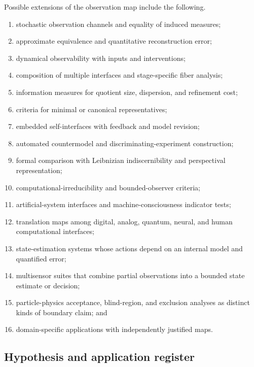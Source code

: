Possible extensions of the observation map include the following.
\begin{enumerate}[label=(\roman*)]
\item stochastic observation channels and equality of induced measures;
\item approximate equivalence and quantitative reconstruction error;
\item dynamical observability with inputs and interventions;
\item composition of multiple interfaces and stage-specific fiber analysis;
\item information measures for quotient size, dispersion, and refinement cost;
\item criteria for minimal or canonical representatives;
\item embedded self-interfaces with feedback and model revision;
\item automated countermodel and discriminating-experiment construction;
\item formal comparison with Leibnizian indiscernibility and perspectival representation;
\item computational-irreducibility and bounded-observer criteria;
\item artificial-system interfaces and machine-consciousness indicator tests;
\item translation maps among digital, analog, quantum, neural, and human computational interfaces;
\item state-estimation systems whose actions depend on an internal model and quantified error;
\item multisensor suites that combine partial observations into a bounded state estimate or decision;
\item particle-physics acceptance, blind-region, and exclusion analyses as distinct kinds of boundary claim; and
\item domain-specific applications with independently justified maps.
\end{enumerate}

\subsection{Hypothesis and application register}

